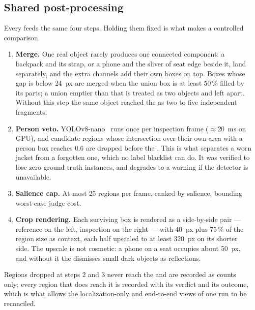 \subsection{Shared post-processing}
\label{sec:method:post}

Every \proposer{} feeds the same four steps. Holding them fixed is what makes
 a controlled comparison.

\begin{enumerate}
  \item \textbf{Merge.} One real object rarely produces one connected
        component: a backpack and its strap, or a phone and the sliver of seat
        edge beside it, land separately, and the extra channels add their own
        boxes on top. Boxes whose gap is below 24~px are merged when the union
        box is at least 50\,\% filled by its parts; a union emptier than that
        is treated as two objects and left apart. Without this step the same
        object reached the \judge{} as two to five independent fragments.
  \item \textbf{Person veto.} YOLOv8-nano~\cite{Jocher_2023_yolov8} runs once
        per inspection frame ($\approx$20~ms on GPU), and candidate regions
        whose intersection over their own area with a person box reaches 0.6
        are dropped before the \judge{}. This is what separates a worn jacket
        from a forgotten one, which no label blacklist can do. It was verified
        to lose zero ground-truth instances, and degrades to a warning if the
        detector is unavailable.
  \item \textbf{Salience cap.} At most 25 regions per frame, ranked by
        salience, bounding worst-case judge cost.
  \item \textbf{Crop rendering.} Each surviving box is rendered as a
        side-by-side pair --- reference on the left, inspection on the right ---
        with 40~px plus 75\,\% of the region size as context, each half
        upscaled to at least 320~px on its shorter side. The upscale is not
        cosmetic: a phone on a seat occupies about 50~px, and without it the
        \judge{} dismisses small dark objects as reflections.
\end{enumerate}

Regions dropped at steps 2 and 3 never reach the \judge{} and are recorded as
counts only; every region that does reach it is recorded with its verdict and
its outcome, which is what allows the localization-only and end-to-end views of
one run to be reconciled.

